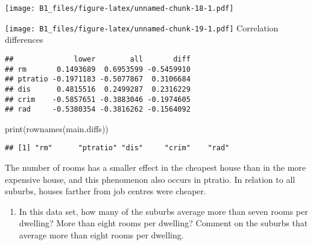 \documentclass[
]{article}
\newenvironment{Shaded}{\begin{snugshade}}{\end{snugshade}}
\newcommand{\AttributeTok}[1]{\textcolor[rgb]{0.77,0.63,0.00}{#1}}
\newcommand{\DecValTok}[1]{\textcolor[rgb]{0.00,0.00,0.81}{#1}}
\newcommand{\FunctionTok}[1]{\textcolor[rgb]{0.00,0.00,0.00}{#1}}
\newcommand{\NormalTok}[1]{#1}
\newcommand{\OtherTok}[1]{\textcolor[rgb]{0.56,0.35,0.01}{#1}}
\newcommand{\SpecialCharTok}[1]{\textcolor[rgb]{0.00,0.00,0.00}{#1}}
\newcommand{\StringTok}[1]{\textcolor[rgb]{0.31,0.60,0.02}{#1}}
\providecommand{\tightlist}{%
  \setlength{\itemsep}{0pt}\setlength{\parskip}{0pt}}
\begin{document}
\texttt{[image: B1\_files/figure-latex/unnamed-chunk-18-1.pdf]}

\begin{Shaded}
\end{Shaded}

\texttt{[image: B1\_files/figure-latex/unnamed-chunk-19-1.pdf]}
Correlation differences

\begin{Shaded}
\end{Shaded}

\begin{verbatim}
##              lower        all       diff
## rm       0.1493689  0.6953599 -0.5459910
## ptratio -0.1971183 -0.5077867  0.3106684
## dis      0.4815516  0.2499287  0.2316229
## crim    -0.5857651 -0.3883046 -0.1974605
## rad     -0.5380354 -0.3816262 -0.1564092
\end{verbatim}

\begin{Shaded}
\begin{Highlighting}[]
\FunctionTok{print}\NormalTok{(}\FunctionTok{rownames}\NormalTok{(main.diffs))}
\end{Highlighting}
\end{Shaded}

\begin{verbatim}
## [1] "rm"      "ptratio" "dis"     "crim"    "rad"
\end{verbatim}

The number of rooms has a smaller effect in the cheapest house than in
the more expensive house, and this phenomenon also occurs in ptratio. In
relation to all suburbs, houses farther from job centres were cheaper.

\begin{enumerate}
\def\labelenumi{(\alph{enumi})}
\setcounter{enumi}{7}
\tightlist
\item
  In this data set, how many of the suburbs average more than seven
  rooms per dwelling? More than eight rooms per dwelling? Comment on the
  suburbs that average more than eight rooms per dwelling.
\end{enumerate}
\end{document}
